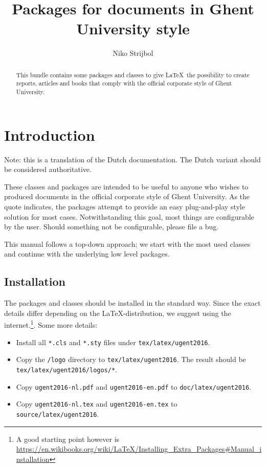 \documentclass[11pt,parskip=half-]{scrartcl}
\title{Packages for documents in Ghent University style}
\author{Niko Strijbol}
\begin{document}
\maketitle

\begin{abstract}
    \noindent This bundle contains some packages and classes to give \LaTeX\ the possibility to create reports, articles and books that comply with the official corporate style of Ghent University.
\end{abstract}

\tableofcontents

\section{Introduction}\label{sec:introductie}


Note: this is a translation of the Dutch documentation. The Dutch variant should be considered authoritative.

These classes and packages are intended to be useful to anyone who wishes to produced documents in the official corporate style of Ghent University. As the quote indicates, the packages attempt to provide an easy plug-and-play style solution for most cases. Notwithstanding this goal, most things are configurable by the user. Should something not be configurable, please file a bug.

This manual follows a top-down approach; we start with the most used classes and continue with the underlying low level packages.

\subsection{Installation}\label{subsec:installatie}
The packages and classes should be installed in the standard way. Since the exact details differ depending on the \LaTeX-distribution, we suggest using the internet.\footnote{A good starting point however is \url{https://en.wikibooks.org/wiki/LaTeX/Installing_Extra_Packages\#Manual_installation}}. Some more details:
\begin{itemize}
    \item Install all \texttt{*.cls} and \texttt{*.sty} files under \texttt{tex/latex/ugent2016}.
    \item Copy the \texttt{/logo} directory to \texttt{tex/latex/ugent2016}. The result should be \texttt{tex/latex/ugent2016/logos/*}.
    \item Copy \texttt{ugent2016-nl.pdf} and \texttt{ugent2016-en.pdf} to \texttt{doc/latex/ugent2016}.
    \item Copy \texttt{ugent2016-nl.tex} and \texttt{ugent2016-en.tex} to \texttt{source/latex/ugent2016}.
\end{itemize}
\end{document}
